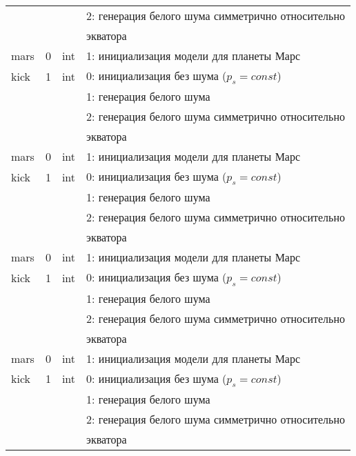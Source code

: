 \begin{longtable}[c]{|l|c|l|l|}
             &        &     & 2: генерация белого шума симметрично относительно \\
             &        &     & экватора                                          \\
    mars     & 0      & int & 1: инициализация модели для планеты Марс          \\
    kick     & 1      & int & 0: инициализация без шума (\(p_s = const\))       \\
             &        &     & 1: генерация белого шума                          \\
             &        &     & 2: генерация белого шума симметрично относительно \\
             &        &     & экватора                                          \\
    mars     & 0      & int & 1: инициализация модели для планеты Марс          \\
    kick     & 1      & int & 0: инициализация без шума (\(p_s = const\))       \\
             &        &     & 1: генерация белого шума                          \\
             &        &     & 2: генерация белого шума симметрично относительно \\
             &        &     & экватора                                          \\
    mars     & 0      & int & 1: инициализация модели для планеты Марс          \\
    kick     & 1      & int & 0: инициализация без шума (\(p_s = const\))       \\
             &        &     & 1: генерация белого шума                          \\
             &        &     & 2: генерация белого шума симметрично относительно \\
             &        &     & экватора                                          \\
    mars     & 0      & int & 1: инициализация модели для планеты Марс          \\
    kick     & 1      & int & 0: инициализация без шума (\(p_s = const\))       \\
             &        &     & 1: генерация белого шума                          \\
             &        &     & 2: генерация белого шума симметрично относительно \\
             &        &     & экватора                                          \\

\end{longtable}
